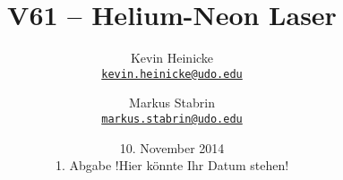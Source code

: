 



\title{%
    V61 -- Helium-Neon Laser
}
\author{%
    Kevin Heinicke\\
    \texttt{\href{mailto:kevin.heinicke@udo.edu}{kevin.heinicke@udo.edu}}
    \and
    Markus Stabrin\\
    \texttt{\href{mailto:markus.stabrin@udo.edu}{markus.stabrin@udo.edu}}
}
\date{%
    10. November 2014\\
    {\small 1. Abgabe} !Hier könnte Ihr Datum stehen!
}

    \maketitle%
    \tableofcontents
    \newpage

    
    
    \printbibliography

